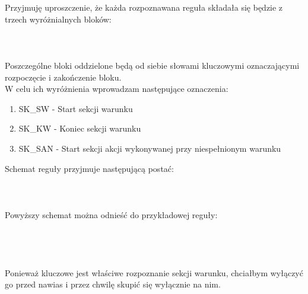Przyjmuję uproszczenie, że każda rozpoznawana reguła składała się będzie z trzech wyróżnialnych bloków:
\\ \\
\\ \\

Poszczególne bloki oddzielone będą od siebie słowami kluczowymi oznaczającymi rozpoczęcie i zakończenie bloku. \\

W celu ich wyróżnienia wprowadzam następujące oznaczenia:
\begin{enumerate}
	\item SK\_SW - Start sekcji warunku
	\item SK\_KW - Koniec sekcji warunku
	\item SK\_SAN - Start sekcji akcji wykonywanej przy niespełnionym warunku
\end{enumerate}
Schemat reguły przyjmuje następującą postać:
\\ \\
\\ \\

Powyższy schemat można odnieść do przykładowej reguły:
\\ \\
\\ \\

\paragraph{}
Ponieważ kluczowe jest właściwe rozpoznanie sekcji warunku, chciałbym wyłączyć go przed nawias i przez chwilę skupić się wyłącznie na nim. 

